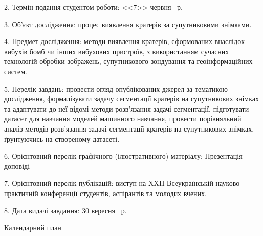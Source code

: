 2. Термін подання студентом роботи: <<7>> червня \YearOfDefence~р.

3. Об'єкт дослідження: процес виявлення кратерів за супутниковими знімками.

4. Предмет дослідження: методи виявлення кратерів, сформованих внаслідок вибухів
бомб чи інших вибухових пристроїв, з використанням сучасних технологій обробки зображень,
супутникового зондування та геоінформаційних систем.

5. Перелік завдань: провести огляд опублікованих джерел за тематикою дослідження,
формалізувати задачу сегментації кратерів на супутникових знімках
та адаптувати до неї відомі методи розв'язання задачі сегментації,
підготувати датасет для навчання моделей машинного навчання,
провести порівняльний аналіз методів розв'язання задачі сегментації
кратерів на супутникових знімках, ґрунтуючись на створеному датасеті.

6. Орієнтовний перелік графічного (ілюстративного) матеріалу: Презентація доповіді

7. Орієнтовний перелік публікацій: виступ на XXII Всеукраїнській
науково-практичній конференції студентів, аспірантів
та молодих вчених.

8. Дата видачі завдання: 30 вересня \YearOfBeginning~р.


\begin{center}
    Календарний план
\end{center}

